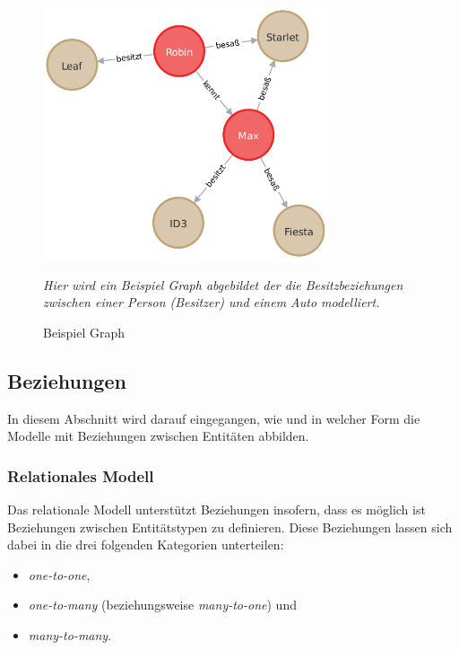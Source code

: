 \begin{figure}[ht]
    \centering
    \includegraphics[width=0.75\textwidth]{images/example_graph.pdf}
    \caption{Beispiel Graph}
    \vspace{1em}
    \textit{Hier wird ein Beispiel Graph abgebildet der die Besitzbeziehungen zwischen einer Person (Besitzer) und einem Auto modelliert.}
    \label{fig:beispiel_graph}
\end{figure}

\subsection{Beziehungen}
\label{datenmodelle:beziehungen}
In diesem Abschnitt wird darauf eingegangen, wie und in welcher Form die Modelle mit Beziehungen zwischen Entitäten abbilden. 

\subsubsection{Relationales Modell}
Das relationale Modell unterstützt Beziehungen insofern, dass es möglich ist Beziehungen zwischen Entitätstypen zu definieren. Diese Beziehungen lassen sich dabei in die drei folgenden Kategorien unterteilen: 
\begin{itemize}
    \item \textit{one-to-one}, 
    \item \textit{one-to-many} (beziehungsweise \textit{many-to-one}) und 
    \item \textit{many-to-many}.
\end{itemize}

